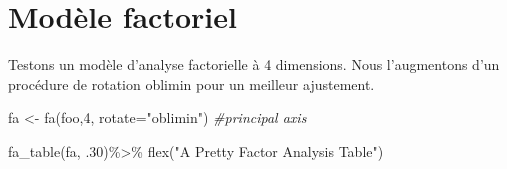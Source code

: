 \documentclass[
]{book}
\newenvironment{Shaded}{\begin{snugshade}}{\end{snugshade}}
\newcommand{\AttributeTok}[1]{\textcolor[rgb]{0.77,0.63,0.00}{#1}}
\newcommand{\CommentTok}[1]{\textcolor[rgb]{0.56,0.35,0.01}{\textit{#1}}}
\newcommand{\DecValTok}[1]{\textcolor[rgb]{0.00,0.00,0.81}{#1}}
\newcommand{\FunctionTok}[1]{\textcolor[rgb]{0.00,0.00,0.00}{#1}}
\newcommand{\NormalTok}[1]{#1}
\newcommand{\OtherTok}[1]{\textcolor[rgb]{0.56,0.35,0.01}{#1}}
\newcommand{\SpecialCharTok}[1]{\textcolor[rgb]{0.00,0.00,0.00}{#1}}
\newcommand{\StringTok}[1]{\textcolor[rgb]{0.31,0.60,0.02}{#1}}
\begin{document}
\hypertarget{moduxe8le-factoriel}{%
\section{Modèle factoriel}\label{moduxe8le-factoriel}}

Testons un modèle d'analyse factorielle à 4 dimensions. Nous l'augmentons d'un procédure de rotation oblimin pour un meilleur ajustement.

\begin{Shaded}
\begin{Highlighting}[]
\NormalTok{fa }\OtherTok{\textless{}{-}} \FunctionTok{fa}\NormalTok{(foo,}\DecValTok{4}\NormalTok{, }\AttributeTok{rotate=}\StringTok{"oblimin"}\NormalTok{)  }\CommentTok{\#principal axis }

\FunctionTok{fa\_table}\NormalTok{(fa, .}\DecValTok{30}\NormalTok{)}\SpecialCharTok{\%\textgreater{}\%}
  \FunctionTok{flex}\NormalTok{(}\StringTok{"A Pretty Factor Analysis Table"}\NormalTok{)}
\end{Highlighting}
\end{Shaded}

\providecommand{\docline}[3]{\noalign{\global\setlength{\arrayrulewidth}{#1}}\arrayrulecolor[HTML]{#2}\cline{#3}}

\setlength{\tabcolsep}{2pt}

\renewcommand*{\arraystretch}{1.5}
\end{document}
